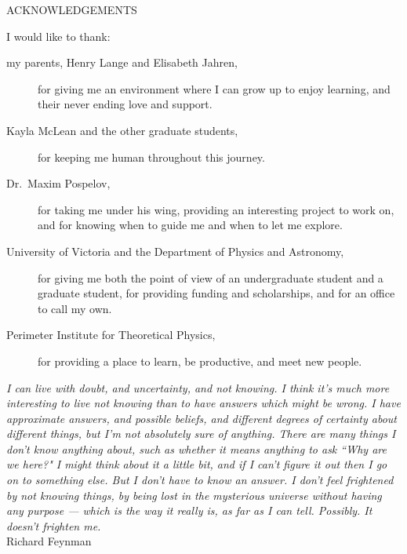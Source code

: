 \newpage
{}

\begin{center}
ACKNOWLEDGEMENTS
\end{center}

\noindent I would like to thank:
\begin{description}
\item[my parents, Henry Lange and Elisabeth Jahren,]
    for giving me an environment where I can grow up to enjoy learning, and their never ending love and support.
\item[Kayla McLean and the other graduate students,]
    for keeping me human throughout this journey.
\item[Dr.~Maxim Pospelov,]
    for taking me under his wing, providing an interesting project to work on, and for knowing when to guide me and when to let me explore.
\item[University of Victoria and the Department of Physics and Astronomy,]
    for giving me both the point of view of an undergraduate student and a graduate student, for providing funding and scholarships, and for an office to call my own.
\item[Perimeter Institute for Theoretical Physics,]
    for providing a place to learn, be productive, and meet new people.
\end{description}

\begin{flushright}
\textit{I can live with doubt, and uncertainty, and not
knowing. I think it's much more interesting to live not
knowing than to have answers which might be wrong.
I have approximate answers, and possible beliefs,
and different degrees of certainty about different things,
but I'm not absolutely sure of anything.
There are many things I don't know anything about,
such as whether it means anything to ask ``Why are we here?"
I might think about it a little bit, and if I can't
figure it out then I go on to something else.
But I don't have to know an answer.
I don't feel frightened by not knowing things,
by being lost in the mysterious universe without having any purpose —
which is the way it really is, as far as I can tell.
Possibly. It doesn't frighten me.}
\\
Richard Feynman\\
\end{flushright}
